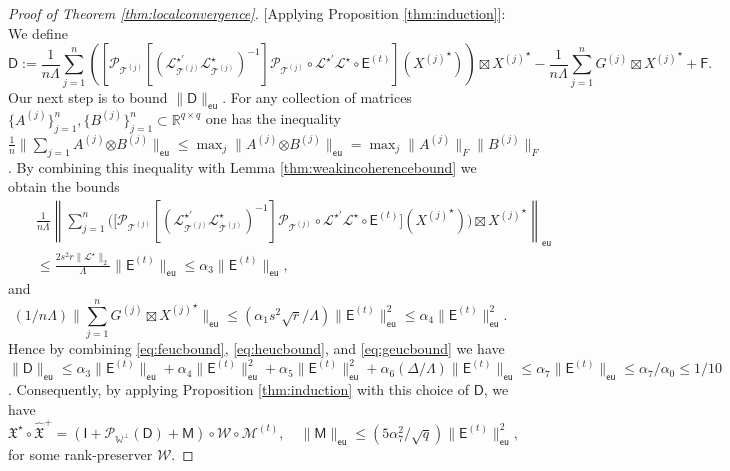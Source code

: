 \documentclass[11pt,letterpaper]{article}
\newcommand{\botimes}{\boldsymbol \otimes}
\newcommand{\ct}{\mathcal{T}}
\newcommand{\cp}{\mathcal{P}}
\newcommand{\xx}{\mathfrak{X}}
\newcommand{\sfe}{\mathsf{E}}
\newcommand{\sfd}{\mathsf{D}}
\newcommand{\sff}{\mathsf{F}}
\newcommand{\sfi}{\mathsf{I}}
\newcommand{\sfm}{\mathsf{M}}
\newcommand{\eu}{\mathsf{eu}}
\newcommand{\coveig}{\Lambda}
\newcommand{\covsup}{\Delta}
\begin{document}
\begin{proof}[Proof of Theorem \ref{thm:localconvergence}]
	[Applying Proposition \ref{thm:induction}]:  We define
	\begin{equation*}
	\sfd := \frac{1}{n \coveig} \sum_{j=1}^{n} ([\cp_{\ct^{(j)}}[(\mathcal{L}^{\star\prime}_{\ct^{(j)}}\mathcal{L}^{\star}_{\ct^{(j)}})^{-1}]\cp_{\ct^{(j)}}  \circ \mathcal{L}^{\star\prime} \mathcal{L}^{\star} \circ \sfe^{(t)}] ({X^{(j)}}^{\star})) \boxtimes {X^{(j)}}^{\star} - \frac{1}{n\coveig} \sum_{j=1}^{n} G^{(j)} \boxtimes {X^{(j)}}^{\star} + \sff.
	\end{equation*}
	Our next step is to bound $\|\sfd \|_{\eu}$.  For any collection of matrices $\{A^{(j)} \}_{j=1}^{n}, \{B^{(j)} \}_{j=1}^{n} \subset \mathbb{R}^{q\times q}$ one has the inequality $\frac{1}{n} \|\sum_{j=1} A^{(j)}\botimes B^{(j)}\|_{\eu} \leq \max_j \|A^{(j)}\botimes B^{(j)}\|_{\eu} = \max_j \|A^{(j)}\|_F \|B^{(j)}\|_F$.  By combining this inequality with Lemma \ref{thm:weakincoherencebound} we obtain the bounds
	\begin{eqnarray} \label{eq:heucbound}
	& & \frac{1}{n\coveig} \left\|\sum_{j=1}^{n}  \bigl(\bigl[\cp_{\ct^{(j)}}[(\mathcal{L}^{\star\prime}_{\ct^{(j)}}\mathcal{L}^{\star}_{\ct^{(j)}})^{-1}]\cp_{\ct^{(j)}}  \circ \mathcal{L}^{\star\prime} \mathcal{L}^{\star} \circ \sfe^{(t)} \bigr] ({X^{(j)}}^{\star})\bigr) \boxtimes {X^{(j)}}^{\star}  \right\|_{\eu} \nonumber\\ 
	& &  \leq \frac{2 s^2 r \|\mathcal{L}^{\star}\|_{2}}{\coveig }   \|\sfe^{(t)}\|_{\eu} \leq \alpha_3 \|\sfe^{(t)}\|_{\eu},
	\end{eqnarray}
	and
	\begin{equation}\label{eq:geucbound}
	(1/n\coveig)\| \sum_{j=1}^{n} G^{(j)} \boxtimes {X^{(j)}}^{\star} \|_{\eu} \leq (\alpha_1 s^2 \sqrt{r}/ \coveig) \| \sfe^{(t)} \|_{\eu}^2 \leq \alpha_4 \| \sfe^{(t)} \|_{\eu}^2.
	\end{equation}
	Hence by combining \eqref{eq:feucbound}, \eqref{eq:heucbound}, and \eqref{eq:geucbound} we have $\|\sfd\|_{\eu} \leq \alpha_3 \|\sfe^{(t)}\|_{\eu} + \alpha_4 \| \sfe^{(t)} \|_{\eu}^2 + \alpha_5\|\sfe^{(t)}\|_{\eu}^{2} + \alpha_6(\covsup/\coveig)\| \sfe^{(t)}\|_{\eu} \leq \alpha_7 \| \sfe^{(t)}\|_{\eu} \leq \alpha_7 /\alpha_0 \leq 1/10$.  Consequently, by applying Proposition \ref{thm:induction} with this choice of $\sfd$, we have
	\begin{equation} \label{eq:xxhat}
	\xx^{\star} \circ \hat{\xx}^{+} = (\sfi + \cp_{\mathbb{W}^{\perp}} (\sfd) + \sfm ) \circ \mathcal{W} \circ \mathcal{M}^{(t)}, \quad \|\sfm\|_{\eu}\leq (5\alpha_7^2/\sqrt{q})\|\sfe^{(t)}\|^2_{\eu},
	\end{equation}
	for some rank-preserver $\mathcal{W}$.
	

\end{proof}
\end{document}
